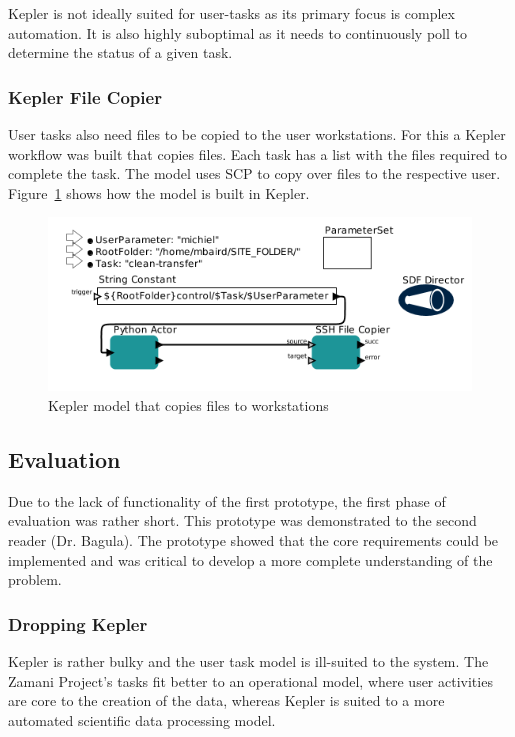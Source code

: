 Kepler is not ideally suited for user-tasks as its primary focus is complex
automation. It is also highly suboptimal as it needs to
continuously poll to determine the status of a given task.

\subsubsection{Kepler File Copier}
User tasks also need files to be copied to the user workstations. For this
a Kepler workflow was built that copies files. Each task has a list with the
files required to complete the task. The model uses SCP to copy over files
to the respective user. Figure~\ref{kepler_file_model} shows how the model
is built in Kepler.

\begin{figure}[!h]
    \begin{center}
        \includegraphics[scale=0.6]{figures/kepler_file.png}
    \end{center}
    \caption{Kepler model that copies files to workstations}
    \label{kepler_file_model}
\end{figure}


\subsection{Evaluation}
Due to the lack of functionality of the first prototype, the first
phase of evaluation was rather short. This prototype was demonstrated to
the second reader (Dr. Bagula). The prototype showed that the core
requirements could be implemented and was critical to develop a more
complete understanding of the problem.


\subsubsection{Dropping Kepler}
Kepler is rather bulky and the user task model is ill-suited to the system.
The Zamani Project's tasks fit better to an operational model, where user activities
are core to the creation of the data,  whereas Kepler is suited to a more automated scientific
data processing model.

